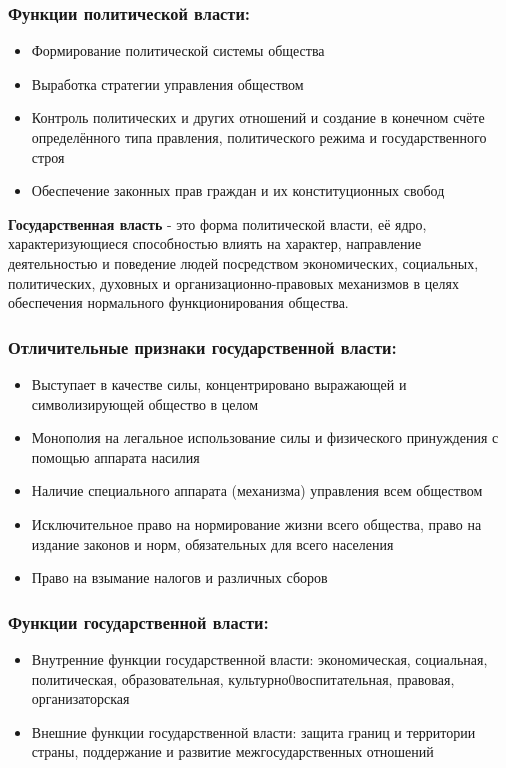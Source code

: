 \subsubsection{Функции политической власти:}

\begin{itemize}
      \item Формирование политической системы общества
      \item Выработка стратегии управления обществом
      \item Контроль политических и других отношений и создание в конечном счёте
            определённого типа правления, политического режима и государственного строя
      \item Обеспечение законных прав граждан и их конституционных свобод
\end{itemize}

\textbf{Государственная власть} - это форма политической власти, её ядро,
характеризующиеся способностью влиять на характер, направление деятельностью и поведение
людей посредством экономических, социальных, политических, духовных и
организационно-правовых механизмов в целях обеспечения нормального функционирования
общества.

\subsubsection{Отличительные признаки государственной власти:}
\begin{itemize}
      \item Выступает в качестве силы, концентрировано выражающей и символизирующей
            общество в целом
      \item Монополия на легальное использование силы и физического принуждения с помощью
            аппарата насилия
      \item Наличие специального аппарата (механизма) управления всем обществом
      \item Исключительное право на нормирование жизни всего общества, право на издание
            законов и норм, обязательных для всего населения
      \item Право на взымание налогов и различных сборов
\end{itemize}

\subsubsection{Функции государственной власти:}
\begin{itemize}
      \item Внутренние функции государственной власти: экономическая, социальная,
            политическая, образовательная, культурно0воспитательная, правовая,
            организаторская
      \item Внешние функции государственной власти: защита границ и территории страны,
            поддержание и развитие межгосударственных отношений
\end{itemize}
